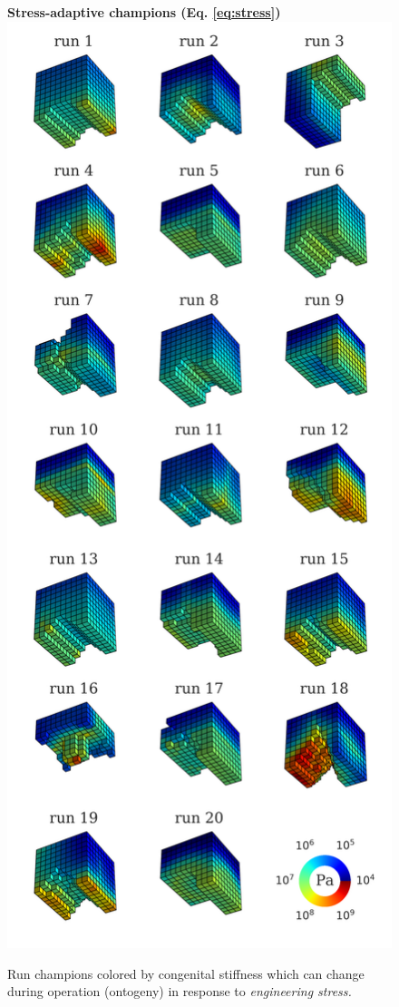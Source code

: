 \begin{figure}%
\centering
{\large \textbf{Stress-adaptive champions (Eq. \ref{eq:stress})}}
\includegraphics[width=0.5\linewidth]{Chapter06/img/stress_run_champs}
\caption{\label{fig6:stress} Run champions colored by congenital stiffness which can change during operation (ontogeny) in response to \textit{engineering stress.}}
\end{figure}

